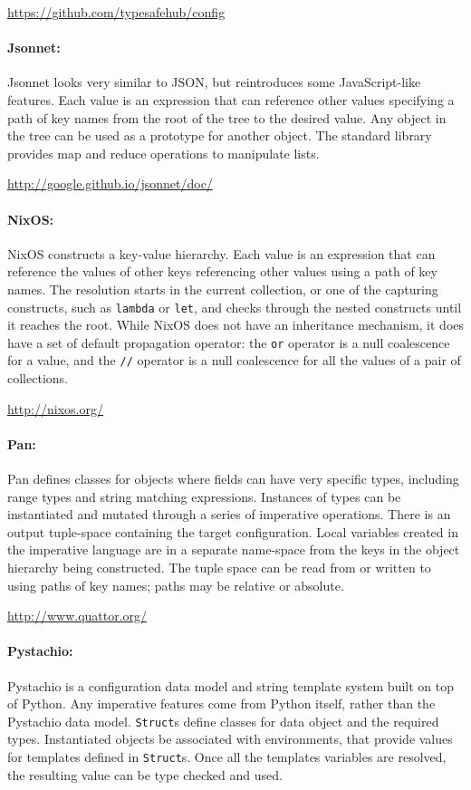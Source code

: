 \documentclass[letterpaper,twocolumn,10pt]{article}
\begin{document}
\noindent \url{https://github.com/typesafehub/config}

\paragraph{Jsonnet:}
Jsonnet looks very similar to JSON, but reintroduces some JavaScript-like features. Each value is an expression that can reference other values specifying a path of key names from the root of the tree to the desired value. Any object in the tree can be used as a prototype for another object. The standard library provides map and reduce operations to manipulate lists.

\noindent \url{http://google.github.io/jsonnet/doc/}

\paragraph{NixOS:}
NixOS constructs a key-value hierarchy. Each value is an expression that can reference the values of other keys referencing other values using a path of key names. The resolution starts in the current collection, or one of the capturing constructs, such as \texttt{lambda} or \texttt{let}, and checks through the nested constructs until it reaches the root. While NixOS does not have an inheritance mechanism, it does have a set of default propagation operator: the \texttt{or} operator is a null coalescence for a value, and the \texttt{//} operator is a null coalescence for all the values of a pair of collections.

\noindent\url{http://nixos.org/}

\paragraph{Pan:}
Pan defines classes for objects where fields can have very specific types, including range types and string matching expressions. Instances of types can be instantiated and mutated through a series of imperative operations. There is an output tuple-space containing the target configuration. Local variables created in the imperative language are in a separate name-space from the keys in the object hierarchy being constructed. The tuple space can be read from or written to using paths of key names; paths may be relative or absolute.

\noindent \url{http://www.quattor.org/}

\paragraph{Pystachio:}
Pystachio is a configuration data model and string template system built on top of Python. Any imperative features come from Python itself, rather than the Pystachio data model. \texttt{Struct}s define classes for data object and the required types. Instantiated objects be associated with environments, that provide values for templates defined in \texttt{Struct}s. Once all the templates variables are resolved, the resulting value can be type checked and used.
\end{document}
